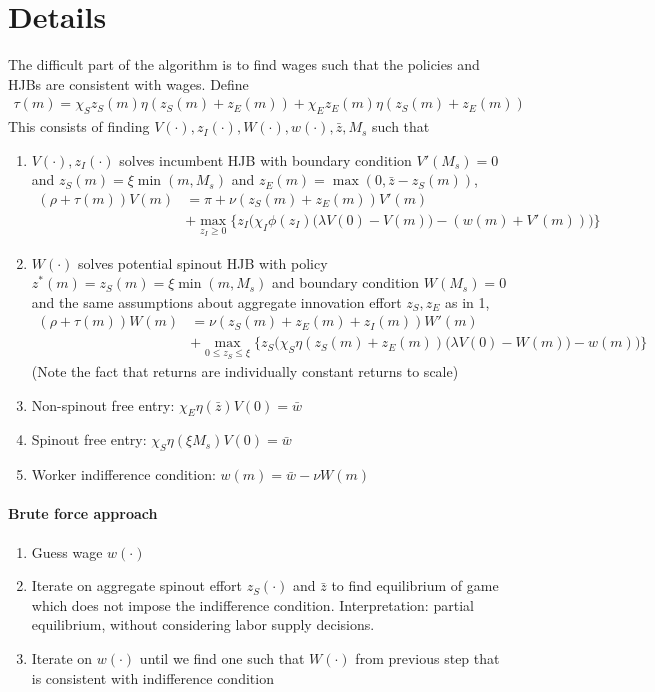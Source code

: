 \documentclass[12pt,english]{article}
\theoremstyle{remark}
\begin{document}
\section{Details}
The difficult part of the algorithm is to find wages such that the policies and HJBs are consistent with wages. Define
\begin{align*}
\tau(m) = \chi_Sz_S(m)\eta(z_S(m) + z_E(m)) + \chi_Ez_E(m)\eta(z_S(m) + z_E(m))
\end{align*}
This consists of finding $V(\cdot),z_I(\cdot),W(\cdot),w(\cdot),\bar{z},M_s$ such that
\begin{enumerate}
	\item $V(\cdot),z_I(\cdot)$ solves incumbent HJB with boundary condition $V'(M_s) = 0$ and $z_S(m) = \xi \min(m,M_s)$ and $z_E(m) = \max(0,\bar{z}-z_S(m))$, 
	\begin{align*}
	(\rho + \tau(m)) V(m) &= \pi + \nu (z_S(m) + z_E(m)) V'(m) \\
	&+ \max_{z_I \ge 0} \Big\{ z_I \Big( \chi_I \phi(z_I) \Big(\lambda V(0) - V(m) \Big) - (w(m) + V'(m)) \Big) \Big\}
	\end{align*}
	\item $W(\cdot)$ solves potential spinout HJB with policy $z^*(m) = z_S(m) = \xi \min(m,M_s)$ and boundary condition $W(M_s) = 0$ and the same assumptions about aggregate innovation effort $z_S,z_E$ as in 1,
	\begin{align*}
	(\rho + \tau(m)) W(m) &= \nu (z_S(m) + z_E(m) + z_I(m) )W'(m) \\
	&+ \max_{0 \le z_S \le \xi} \Big\{ z_S\Big(\chi_S \eta(z_S(m) + z_E(m))\Big( \lambda V(0) - W(m) \Big) - w(m) \Big)    \Big\}
	\end{align*}
	(Note the fact that returns are individually constant returns to scale)
	\item Non-spinout free entry: $\chi_E \eta(\bar{z}) V(0) = \bar{w}$
	\item Spinout free entry: $\chi_S \eta(\xi M_s) V(0) = \bar{w}$
	\item Worker indifference condition: $w(m) = \bar{w} - \nu W(m)$
\end{enumerate}

\paragraph{Brute force approach}
\begin{enumerate}
	\item Guess wage $w(\cdot)$
	\item Iterate on aggregate spinout effort $z_S(\cdot)$ and $\bar{z}$ to find equilibrium of game which does not impose the indifference condition. Interpretation: partial equilibrium, without considering labor supply decisions. 
	\item Iterate on $w(\cdot)$ until we find one such that $W(\cdot)$ from previous step that is consistent with indifference condition
\end{enumerate}
\end{document}
